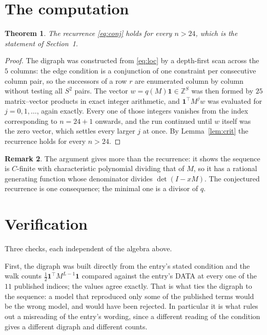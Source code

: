 \documentclass[11pt,a4paper]{article}
\theoremstyle{plain}
\newtheorem{theorem}{Theorem}
\theoremstyle{definition}
\newtheorem{remark}[theorem]{Remark}
\begin{document}
\section{The computation}

\begin{theorem}
The recurrence \eqref{eq:conj} holds for every $n>24$, which is the statement of
Section~1.
\end{theorem}

\begin{proof}
The digraph was constructed from \eqref{eq:loc} by a depth-first scan across the $5$
columns: the edge condition is a conjunction of one constraint per consecutive column
pair, so the successors of a row $r$ are enumerated column by column without testing all
$S^2$ pairs. The vector $w=q(M)\mathbf{1}\in\mathbb{Z}^{S}$ was then formed by $25$
matrix--vector products in exact integer arithmetic, and $\mathbf{1}^{\!\top}M^{j}w$ was
evaluated for $j=0,1,\dots$, again exactly. Every one of those integers vanishes from the
index corresponding to $n=24+1$ onwards, and the run continued until $w$ itself was the
zero vector, which settles every larger $j$ at once. By Lemma~\ref{lem:crit} the recurrence
holds for every $n>24$.
\end{proof}

\begin{remark}
The argument gives more than the recurrence: it shows the sequence is $C$-finite with
characteristic polynomial dividing that of $M$, so it has a rational generating function
whose denominator divides $\det(I-xM)$. The conjectured recurrence is one consequence; the
minimal one is a divisor of $q$.
\end{remark}

\section{Verification}

Three checks, each independent of the algebra above.

First, the digraph was built directly from the entry's stated condition and the walk counts
$\tfrac1{2}\mathbf{1}^{\!\top}M^{L-1}\mathbf{1}$ compared against the entry's DATA at
every one of the $11$ published indices; the values agree exactly. That is what ties
the digraph to the sequence: a model that reproduced only some of the published terms would
be the wrong model, and would have been rejected. In particular it is what rules out a
misreading of the entry's wording, since a different reading of the condition gives a
different digraph and different counts.
\end{document}
